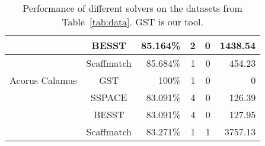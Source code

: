 \begin{table}
\begin{tabular}{|c|c|r|r|r|r|}
         \hline
         & BESST & 85.164\% & 2 & 0 & 1438.54 \\ 
         \hline
         & Scaffmatch & 85.684\% & 1 & 0 & 454.23 \\ 
         \hline
                  \hline
                  Acorus Calamus
         & GST & 100\% & 1 & 0 & 0 \\ 
         \hline   
         & SSPACE & 83.091\% & 4 & 0 & 126.39 \\ 
         \hline
         & BESST & 83.091\% & 4 & 0 & 127.95 \\ 
         \hline
         & Scaffmatch & 83.271\% & 1 & 1 & 3757.13 \\ 
         \hline              
        \end{tabular}
       \caption{Performance of different solvers on the datasets from Table~\ref{tab:data}. GST is our tool. }
        \label{tab:tools}
      \end{table}
      
      
